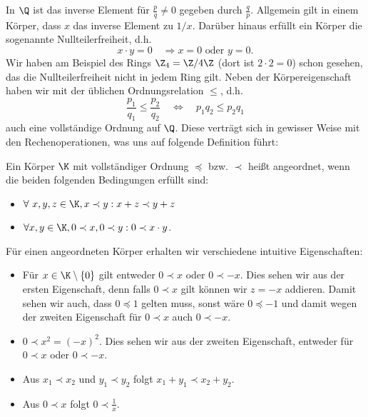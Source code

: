 \documentclass[letterpaper,10pt,english]{jupyterBook}
\begin{document}
In \(\Q\) ist das inverse Element für \(\frac{p}q \neq 0\) gegeben durch \(\frac{q}p\). Allgemein gilt in einem Körper, dass \(x\) das inverse Element zu \(1/x\). Darüber hinaus erfüllt ein Körper die sogenannte Nullteilerfreiheit, d.h.
\begin{equation*}
x \cdot y = 0 \quad \Rightarrow x = 0 \text{ oder } y =0.
\end{equation*}
Wir haben am Beispiel des Rings \(\Z_4=\Z/4\Z\) (dort ist \(2 \cdot 2 = 0\)) schon gesehen, das die Nullteilerfreiheit nicht in jedem Ring gilt.
Neben der Körpereigenschaft haben wir mit der üblichen Ordnungsrelation \(\leq\), d.h.
\begin{equation*}
\frac{p_1}{q_1} \leq \frac{p_2}{q_2} \quad \Leftrightarrow \quad p_1 q_2 \leq p_2 q_1
\end{equation*}
auch eine vollständige Ordnung auf \(\Q\). Diese verträgt sich in gewisser Weise mit den Rechenoperationen, was uns auf folgende Definition führt:
\label{grundlagen/zahlensysteme:definition-10}
\begin{definition}{}{}



Ein Körper \(\K\) mit vollständiger Ordnung \(\preceq\) bzw. \(\prec\)  heißt angeordnet, wenn die beiden folgenden Bedingungen erfüllt sind:
\begin{itemize}
\item {} 
\(\forall~x,y,z \in \K, x \prec y: x+z \prec y+z\)

\item {} 
\(\forall x,y \in \K, 0 \prec x, 0 \prec y: 0 \prec x \cdot y\).

\end{itemize}
\end{definition}

Für einen angeordneten Körper erhalten wir verschiedene intuitive Eigenschaften:
\begin{itemize}
\item {} 
Für \(x \in \K \setminus \{0\}\) gilt entweder \(0 \prec x\) oder \(0 \prec -x\). Dies sehen wir aus der ersten Eigenschaft, denn falls \(0 \prec x\) gilt können wir \(z=-x\) addieren. Damit sehen wir auch, dass \( 0 \preceq 1\) gelten muss, sonst wäre \(0 \preceq -1\) und damit wegen der zweiten Eigenschaft für \(0 \prec x \) auch \(0 \prec -x\).

\item {} 
\(0 \prec x^2 = (-x)^2\). Dies sehen wir aus der zweiten Eigenschaft, entweder für \(0 \prec x\) oder \(0 \prec -x\).

\item {} 
Aus \(x_1 \prec x_2\) und \(y_1 \prec y_2\) folgt \(x_1 + y_1 \prec x_2 + y_2\).

\item {} 
Aus \(0 \prec x\) folgt \(0 \prec \frac{1}x\).

\end{itemize}
\end{document}
